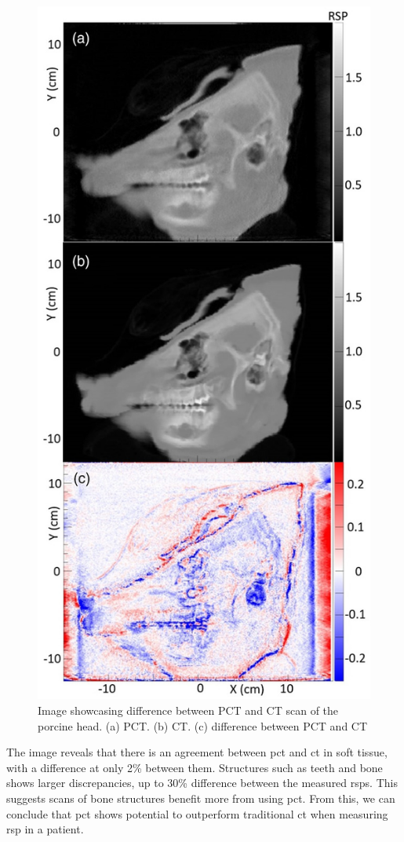 \documentclass[main.tex]{subfiles}
\begin{document}
\begin{figure}[!ht]
    \centering
    \includegraphics[scale=2.5]{images/porcine_comparison.jpg}
    \caption{Image showcasing difference between PCT and CT scan of the porcine head. (a) PCT. (b) CT. (c) difference between PCT and CT \cite{porcine_2021}}
    \label{fig: porcine_pct_vs_ct}
\end{figure}
\FloatBarrier

The image reveals that there is an agreement between \gls{pct} and \gls{ct} in soft tissue, with a difference at only 2\% between them. Structures such as teeth and bone shows larger discrepancies, up to 30\% difference between the measured \gls{rsp}s. This suggests scans of bone structures benefit more from using \gls{pct}. From this, we can conclude that \gls{pct} shows potential to outperform traditional \gls{ct} when measuring \gls{rsp} in a patient.
\end{document}
